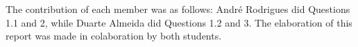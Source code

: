 \cfoot{\thepage}


    \maketitle

    \vspace{-3em}

    \noindent\makebox[\linewidth]{\rule{18cm}{0.4pt}}

        The contribution of each member was as follows: André Rodrigues did Questions 1.1 and 2, 
        while Duarte Almeida did Questions 1.2 and 3. The elaboration of this report was made in colaboration by both students.
    \noindent\makebox[\linewidth]{\rule[1ex]{18cm}{0.4pt}}
    

